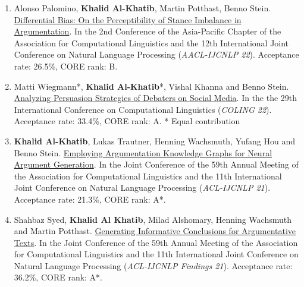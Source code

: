 \begin{enumerate}
{Acceptance rate: 38\%, CORE rank: B.
}
\item {Alonso Palomino, \textbf{Khalid Al-Khatib}, Martin Potthast, Benno Stein. \href{https://aclanthology.org/2022.findings-aacl.39/}{Differential Bias: On the Perceptibility of Stance Imbalance in Argumentation}. In the 2nd Conference of the Asia-Pacific Chapter of the Association for Computational Linguistics and the 12th International Joint Conference on Natural Language Processing (\textit{AACL-IJCNLP 22}).
Acceptance rate: 26.5\%, CORE rank: B.
}
\item {Matti Wiegmann*, \textbf{Khalid Al-Khatib}*, Vishal Khanna and Benno Stein. \href{https://aclanthology.org/2022.coling-1.600/}{Analyzing Persuasion Strategies of Debaters on Social Media}. In the the 29th
International Conference on
Computational Linguistics (\textit{COLING 22}).
Acceptance rate: 33.4\%, CORE rank: A. 
* Equal contribution
}
\item {\textbf{Khalid Al-Khatib}, Lukas Trautner, Henning Wachsmuth, Yufang Hou and Benno Stein. \href{https://aclanthology.org/2021.acl-long.366/}{Employing Argumentation Knowledge Graphs for Neural Argument Generation}. In the Joint Conference of the 59th Annual Meeting of the Association for Computational Linguistics and the 11th International Joint Conference on Natural Language Processing (\textit{ACL-IJCNLP 21}).
Acceptance rate: 21.3\%, CORE rank: A*. 
}
\item {Shahbaz Syed, \textbf{Khalid Al Khatib}, Milad Alshomary, Henning Wachsmuth and Martin Potthast. \href{https://aclanthology.org/2021.findings-acl.306/}{Generating Informative Conclusions for Argumentative Texts}. In the Joint Conference of the 59th Annual Meeting of the Association for Computational Linguistics and the 11th International Joint Conference on Natural Language Processing (\textit{ACL-IJCNLP Findings 21}).
Acceptance rate: 36.2\%, CORE rank: A*. 
}


\end{enumerate}
